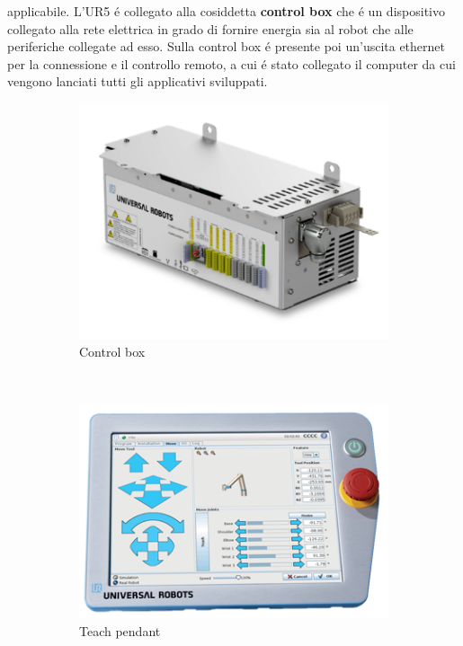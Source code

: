 applicabile.
L'UR5 \'{e} collegato alla cosiddetta \textbf{control box} che \'{e} un dispositivo collegato alla rete elettrica 
in grado di fornire energia sia al robot che alle periferiche collegate ad esso. Sulla control box \'{e} presente poi un'uscita 
ethernet per la connessione e il controllo remoto, a cui \'{e} stato collegato il computer da cui vengono lanciati tutti 
gli applicativi sviluppati.
\begin{figure}[H]
    \centering
    \begin{subfigure}[b]{0.4\textwidth}
        \includegraphics[width=\textwidth]{images/control-box.png}
        \caption{Control box}
        \label{fig:control-box}
    \end{subfigure}
    ~ %
    \begin{subfigure}[b]{0.4\textwidth}
        \includegraphics[width=\textwidth]{images/teach_pendant.png}
        \caption{Teach pendant}
        \label{fig:teach_pendant}
    \end{subfigure}
    \caption{}
    \label{fig:box-pendant}
\end{figure}
